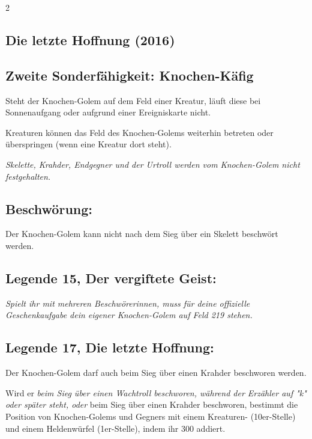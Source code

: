 \documentclass[10pt, a4paper, oneside]{book}
\newcommand{\fan}[1]{\textit{#1}}
\begin{document}
\begin{multicols*}{2}
\columnbreak



\begin{bgcolor}
\section{Die letzte Hoffnung (2016)}


\subsection{Zweite Sonderfähigkeit: Knochen-Käfig}

Steht der Knochen-Golem auf dem Feld einer Kreatur, läuft diese bei Sonnenaufgang oder aufgrund einer Ereigniskarte nicht.
\supercite{dh11-heldenkarte-beschwoerer}

Kreaturen können das Feld des Knochen-Golems weiterhin betreten oder überspringen (wenn eine Kreatur dort steht).

\fan{Skelette, Krahder, Endgegner und der Urtroll werden vom Knochen-Golem nicht festgehalten.}




\subsection{Beschwörung:}

Der Knochen-Golem kann nicht nach dem Sieg über ein Skelett beschwört werden.
\supercite{dh-begleitheft}



\subsection{Legende 15, Der vergiftete Geist:}

\fan{Spielt ihr mit mehreren Beschwörerinnen, muss für deine offizielle Geschenkaufgabe dein eigener Knochen-Golem auf Feld 219 stehen.}





\subsection{Legende 17, Die letzte Hoffnung:}


Der Knochen-Golem darf auch beim Sieg über einen Krahder beschworen werden. 
\supercite{dh-begleitheft}

Wird er \fan{beim Sieg über einen Wachtroll beschworen, während der Erzähler auf "k" oder später steht, oder} beim Sieg über einen Krahder beschworen, bestimmt die Position von Knochen-Golems und Gegners mit einem Kreaturen- (10er-Stelle) und einem Heldenwürfel (1er-Stelle), indem ihr 300 addiert.


\end{bgcolor}
\end{multicols*}
\end{document}
